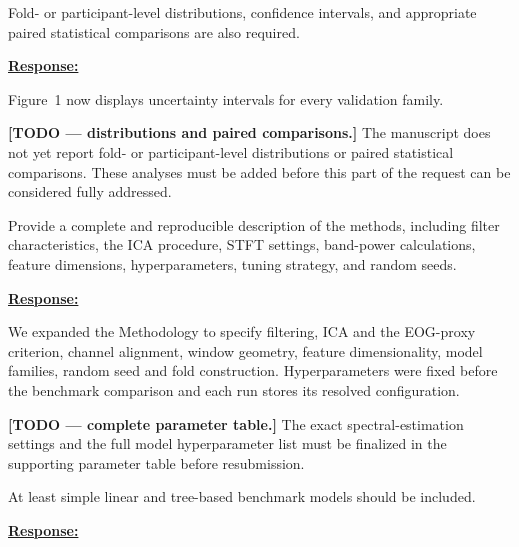 \documentclass{article}
\begin{document}
\vspace{0.3cm}


\begin{cmt}{}{}

Fold- or participant-level distributions, confidence intervals, and appropriate
paired statistical comparisons are also required.

\end{cmt}
\vspace{0.1cm}
\noindent
\underline{\textbf{Response:}}
\vspace{0.2cm}

Figure~1 now displays uncertainty intervals for every validation family.

\textbf{[TODO --- distributions and paired comparisons.]}
The manuscript does not yet report fold- or participant-level distributions or
paired statistical comparisons. These analyses must be added before this part of
the request can be considered fully addressed.

\vspace{0.3cm}


\begin{cmt}{}{}

Provide a complete and reproducible description of the methods, including filter
characteristics, the ICA procedure, STFT settings, band-power calculations,
feature dimensions, hyperparameters, tuning strategy, and random seeds.

\end{cmt}
\vspace{0.1cm}
\noindent
\underline{\textbf{Response:}}
\vspace{0.2cm}

We expanded the Methodology to specify filtering, ICA and the EOG-proxy
criterion, channel alignment, window geometry, feature dimensionality, model
families, random seed and fold construction. Hyperparameters were fixed before
the benchmark comparison and each run stores its resolved configuration.

\textbf{[TODO --- complete parameter table.]}
The exact spectral-estimation settings and the full model hyperparameter list
must be finalized in the supporting parameter table before resubmission.

\vspace{0.3cm}


\begin{cmt}{}{}

At least simple linear and tree-based benchmark models should be included.

\end{cmt}
\vspace{0.1cm}
\noindent
\underline{\textbf{Response:}}
\vspace{0.2cm}
\end{document}
